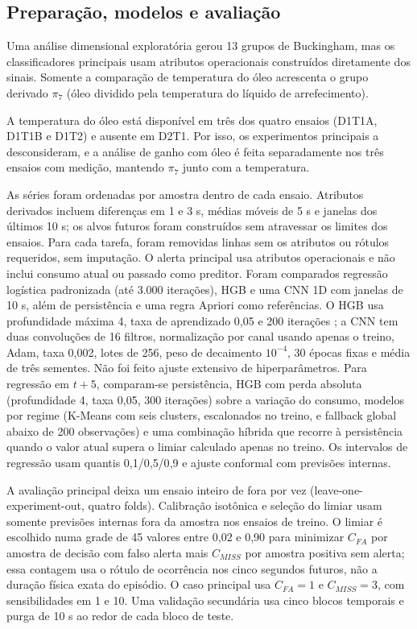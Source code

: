 \documentclass[10pt,a4paper]{article}
\begin{document}
\subsection{Preparação, modelos e avaliação}

Uma análise dimensional exploratória gerou 13 grupos de Buckingham, mas os classificadores principais usam atributos operacionais construídos diretamente dos sinais. Somente a comparação de temperatura do óleo acrescenta o grupo derivado $\pi_7$ (óleo dividido pela temperatura do líquido de arrefecimento).

A temperatura do óleo está disponível em três dos quatro ensaios (D1T1A, D1T1B e D1T2) e ausente em D2T1. Por isso, os experimentos principais a desconsideram, e a análise de ganho com óleo é feita separadamente nos três ensaios com medição, mantendo $\pi_7$ junto com a temperatura.

As séries foram ordenadas por amostra dentro de cada ensaio. Atributos derivados incluem diferenças em 1 e 3 s, médias móveis de 5 s e janelas dos últimos 10 s; os alvos futuros foram construídos sem atravessar os limites dos ensaios. Para cada tarefa, foram removidas linhas sem os atributos ou rótulos requeridos, sem imputação. O alerta principal usa atributos operacionais e não inclui consumo atual ou passado como preditor. Foram comparados regressão logística padronizada (até 3.000 iterações), HGB e uma CNN 1D com janelas de 10 s, além de persistência e uma regra Apriori como referências. O HGB usa profundidade máxima 4, taxa de aprendizado 0{,}05 e 200 iterações \cite{friedman2001}; a CNN tem duas convoluções de 16 filtros, normalização por canal usando apenas o treino, Adam, taxa 0{,}002, lotes de 256, peso de decaimento $10^{-4}$, 30 épocas fixas e média de três sementes. Não foi feito ajuste extensivo de hiperparâmetros. Para regressão em $t+5$, comparam-se persistência, HGB com perda absoluta (profundidade 4, taxa 0{,}05, 300 iterações) sobre a variação do consumo, modelos por regime (K-Means com seis clusters, escalonados no treino, e fallback global abaixo de 200 observações) e uma combinação híbrida que recorre à persistência quando o valor atual supera o limiar calculado apenas no treino. Os intervalos de regressão usam quantis 0{,}1/0{,}5/0{,}9 e ajuste conformal com previsões internas.

A avaliação principal deixa um ensaio inteiro de fora por vez (leave-one-experiment-out, quatro folds). Calibração isotônica e seleção do limiar usam somente previsões internas fora da amostra nos ensaios de treino. O limiar é escolhido numa grade de 45 valores entre 0{,}02 e 0{,}90 para minimizar $C_{FA}$ por amostra de decisão com falso alerta mais $C_{MISS}$ por amostra positiva sem alerta; essa contagem usa o rótulo de ocorrência nos cinco segundos futuros, não a duração física exata do episódio. O caso principal usa $C_{FA}=1$ e $C_{MISS}=3$, com sensibilidades em 1 e 10. Uma validação secundária usa cinco blocos temporais e purga de 10 s ao redor de cada bloco de teste.
\end{document}
